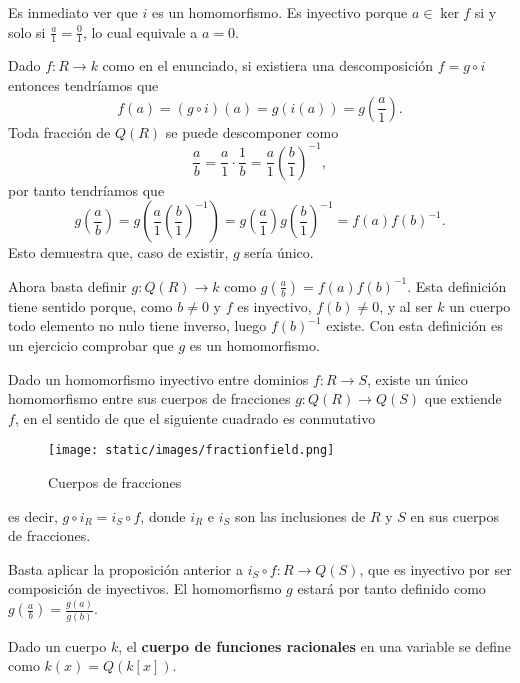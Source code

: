 Es inmediato ver que \(i\) es un homomorfismo. Es inyectivo porque
\(a\in\ker f\) si y solo si \(\frac{a}{1}=\frac{0}{1}\), lo cual
equivale a \(a=0\).

Dado \(f\colon R\rightarrow k\) como en el enunciado, si existiera una
descomposición \(f=g\circ i\) entonces tendríamos que
\[f(a)=(g\circ i)(a)=g(i(a))=g\left(\frac{a}{1}\right).\] Toda fracción
de \(Q( R )\) se puede descomponer como
\[\frac{a}{b}=\frac{a}{1}\cdot\frac{1}{b}=\frac{a}{1}\left(\frac{b}{1}\right)^{-1},\]
por tanto tendríamos que
\[g\left(\frac{a}{b}\right)=g\left(\frac{a}{1}\left(\frac{b}{1}\right)^{-1}\right)=g\left(\frac{a}{1}\right)g\left(\frac{b}{1}\right)^{-1}=f(a)f(b)^{-1}.\]
Esto demuestra que, caso de existir, \(g\) sería único.

Ahora basta definir \(g\colon Q( R )\rightarrow k\) como
\(g\left(\frac{a}{b}\right)=f(a)f(b)^{-1}\). Esta definición tiene
sentido porque, como \(b\neq 0\) y \(f\) es inyectivo, \(f(b)\neq 0\), y
al ser \(k\) un cuerpo todo elemento no nulo tiene inverso, luego
\(f(b)^{-1}\) existe. Con esta definición es un ejercicio comprobar que
\(g\) es un homomorfismo.\\


Dado un homomorfismo inyectivo entre dominios
\(f\colon R\rightarrow S\), existe un único homomorfismo entre sus
cuerpos de fracciones \(g\colon Q( R )\rightarrow Q(S)\) que extiende
\(f\), en el sentido de que el siguiente cuadrado es conmutativo

\begin{figure}
\centering
\texttt{[image: static/images/fractionfield.png]}
\caption{Cuerpos de fracciones}
\end{figure}

es decir, \(g\circ i_R=i_S\circ f\), donde \(i_R\) e \(i_S\) son las
inclusiones de \(R\) y \(S\) en sus cuerpos de fracciones.


Basta aplicar la proposición anterior a
\(i_S\circ f\colon R\rightarrow Q(S)\), que es inyectivo por ser
composición de inyectivos. El homomorfismo \(g\) estará por tanto
definido como \(g\left(\frac{a}{b}\right)=\frac{g(a)}{g(b)}\).


Dado un cuerpo \(k\), el \textbf{cuerpo de funciones racionales} en una
variable se define como \(k(x)=Q(k[x])\). 


